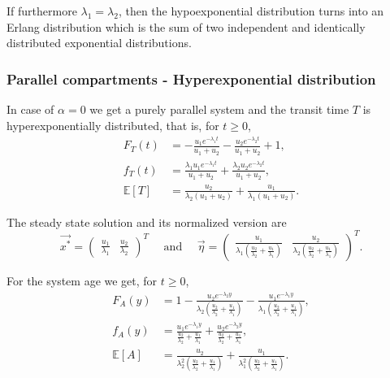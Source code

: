 \documentclass[smallextended]{svjour3}
\newcommand{\E}{\mathbb{E}}
\begin{document}
If furthermore $\lambda_1=\lambda_2$, then the hypoexponential distribution turns into an Erlang distribution which is the sum of two independent and identically distributed exponential distributions.


\subsubsection{Parallel compartments - Hyperexponential distribution}

In case of $\alpha=0$ we get a purely parallel system and the transit time $T$ is hyperexponentially distributed, that is, for $t\geq0$,
\begin{align*}
    F_T(t) &= - \frac{u_{1} e^{- \lambda_{1} t}}{u_{1} + u_{2}} - \frac{u_{2} e^{- \lambda_{2} t}}{u_{1} + u_{2}} + 1,\\
    f_T(t) &= \frac{\lambda_{1} u_{1} e^{- \lambda_{1} t}}{u_{1} + u_{2}} + \frac{\lambda_{2} u_{2} e^{- \lambda_{2} t}}{u_{1} + u_{2}},\\
    \E[T] &= \frac{u_{2}}{\lambda_{2} \left(u_{1} + u_{2}\right)} + \frac{u_{1}}{\lambda_{1} \left(u_{1} + u_{2}\right)}.
\end{align*}

The steady state solution and its normalized version are
\[
\vec{x^\ast} = \left(\begin{matrix}\frac{u_{1}}{\lambda_{1}} & \frac{u_{2}}{\lambda_{2}}\end{matrix}\right)^T\quad\text{ and }\quad \vec{\eta} = \left(\begin{matrix}\frac{u_{1}}{\lambda_{1} \left(\frac{u_{2}}{\lambda_{2}} + \frac{u_{1}}{\lambda_{1}}\right)} & \frac{u_{2}}{\lambda_{2} \left(\frac{u_{2}}{\lambda_{2}} + \frac{u_{1}}{\lambda_{1}}\right)}\end{matrix}\right)^T.
\]

For the system age we get, for $t\geq0$,
\begin{align*}
    F_A(y) &= 1 - \frac{u_{2} e^{- \lambda_{2} y}}{\lambda_{2} \left(\frac{u_{2}}{\lambda_{2}} + \frac{u_{1}}{\lambda_{1}}\right)} - \frac{u_{1} e^{- \lambda_{1} y}}{\lambda_{1} \left(\frac{u_{2}}{\lambda_{2}} + \frac{u_{1}}{\lambda_{1}}\right)},\\
    f_A(y) &= \frac{u_{1} e^{- \lambda_{1} y}}{\frac{u_{2}}{\lambda_{2}} + \frac{u_{1}}{\lambda_{1}}} + \frac{u_{2} e^{- \lambda_{2} y}}{\frac{u_{2}}{\lambda_{2}} + \frac{u_{1}}{\lambda_{1}}},\\
    \E[A] &= \frac{u_{2}}{\lambda_{2}^{2} \left(\frac{u_{2}}{\lambda_{2}} + \frac{u_{1}}{\lambda_{1}}\right)} + \frac{u_{1}}{\lambda_{1}^{2} \left(\frac{u_{2}}{\lambda_{2}} + \frac{u_{1}}{\lambda_{1}}\right)}.
\end{align*}
\end{document}
